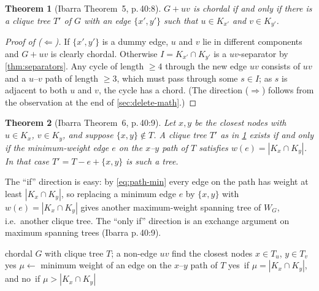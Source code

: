 \documentclass[11pt,a4paper,oneside]{report}
\theoremstyle{plain}
\newtheorem{theorem}{Theorem}[chapter]
\theoremstyle{definition}
\theoremstyle{remark}
\newcommand{\yes}{\textsf{yes}}
\newcommand{\no}{\textsf{no}}
\newcommand{\op}[1]{\textsf{#1}}
\begin{document}
\begin{theorem}[Ibarra Theorem~5, p.\,40:8]\label{thm:insert5}
\(G+uv\) is chordal if and only if there is a clique tree \(T'\) of \(G\) with an edge
\(\{x',y'\}\) such that \(u\in K_{x'}\) and \(v\in K_{y'}\).
\end{theorem}
\begin{proof}[Proof of (\(\Leftarrow\))]
If \(\{x',y'\}\) is a dummy edge, \(u\) and \(v\) lie in different components and \(G+uv\) is
clearly chordal. Otherwise \(I=K_{x'}\cap K_{y'}\) is a \(uv\)-separator by
\cref{thm:separators}. Any cycle of length \(\ge 4\) through the new edge \(uv\) consists of
\(uv\) and a \(u\)--\(v\) path of length \(\ge 3\), which must pass through some \(s\in I\); as
\(s\) is adjacent to both \(u\) and \(v\), the cycle has a chord. (The direction
(\(\Rightarrow\)) follows from the observation at the end of \cref{sec:delete-math}.)
\end{proof}

\begin{theorem}[Ibarra Theorem~6, p.\,40:9]\label{thm:insert6}
Let \(x,y\) be the closest nodes with \(u\in K_x\), \(v\in K_y\), and suppose \(\{x,y\}\notin T\).
A clique tree \(T'\) as in \cref{thm:insert5} exists if and only if the minimum-weight edge
\(e\) on the \(x\)--\(y\) path of \(T\) satisfies \(w(e)=|K_x\cap K_y|\). In that case
\(T'=T-e+\{x,y\}\) is such a tree.
\end{theorem}

The ``if'' direction is easy: by \eqref{eq:path-min} every edge on the path has weight at least
\(|K_x\cap K_y|\), so replacing a minimum edge \(e\) by \(\{x,y\}\) with
\(w(e)=|K_x\cap K_y|\) gives another maximum-weight spanning tree of \(W_G\), i.e.\ another
clique tree. The ``only if'' direction is an exchange argument on maximum spanning trees
(Ibarra p.\,40:9).

\begin{algorithm}[ht]
\caption{\op{Insert-Query}\((u,v)\) (Ibarra \S3.3, p.\,40:10)}\label{alg:insert-query}
\begin{algorithmic}[1]
\Require chordal \(G\) with clique tree \(T\); a non-edge \(uv\)
\State find the closest nodes \(x\in T_u\), \(y\in T_v\)
 \Return \yes \EndIf
\State \(\mu\gets\) minimum weight of an edge on the \(x\)--\(y\) path of \(T\)
\State \Return \yes\ if \(\mu=|K_x\cap K_y|\), and \no\ if \(\mu>|K_x\cap K_y|\)
\end{algorithmic}
\end{algorithm}
\end{document}
